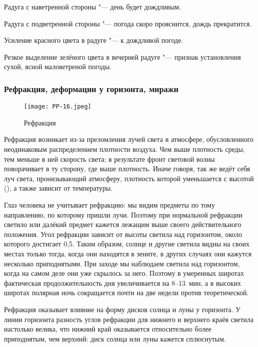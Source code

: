  Радуга с наветренной стороны "--- день будет дождливым.

 Радуга с подветренной стороны "--- погода скоро прояснится, дождь прекратится.

 Усиление красного цвета в радуге "--- к дождливой погоде.

 Резкое выделение зелёного цвета в вечерней радуге "--- признак
установления сухой, ясной маловетреной погоды.

\subsubsection{Рефракция, деформации у горизонта, миражи}

\begin{figure}[htb]
  \centering{}
  \texttt{[image: PP-16.jpeg]}
  \caption{Рефракция}
  \label{fig:pp16}
  \small
  \centering{}
\end{figure}

Рефракция возникает из-за преломления лучей света в атмосфере,
обусловленного неодинаковым распределением плотности воздуха. Чем выше
плотность среды, тем меньше в ней скорость света; в результате фронт
световой волны поворачивает в ту сторону, где выше плотность. Иначе
говоря, так же ведёт себя луч света, пронизывающий атмосферу,
плотность которой уменьшается с высотой (), а также зависит от
температуры.

Глаз человека не учитывает рефракцию: мы видим предметы по тому
направлению, по которому пришли лучи. Поэтому при нормальной рефракции
светило или далёкий предмет кажется лежащим выше своего
действительного положения. Угол рефракции зависит от высоты светила
над горизонтом, около которого достигает 0,5\gr. Таким образом, солнце и
другие светила видны на своих местах только тогда, когда они находятся
в зените, в других случаях они кажутся несколько приподнятыми. При
заходе мы наблюдаем светила над горизонтом, когда на самом деле они
уже скрылось за него. Поэтому в умеренных широтах фактическая
продолжительность дня увеличивается на 8--13~мин, а в высоких широтах
полярная ночь сокращается почти на две недели против теоретической.

Рефракция оказывает влияние на форму дисков солнца и луны у
горизонта. У линии горизонта разность углов рефракции для нижнего и
верхнего краёв светила настолько велика, что нижний край оказывается
относительно более приподнятым, чем верхний: диск солнца или луны
кажется сплюснутым.

